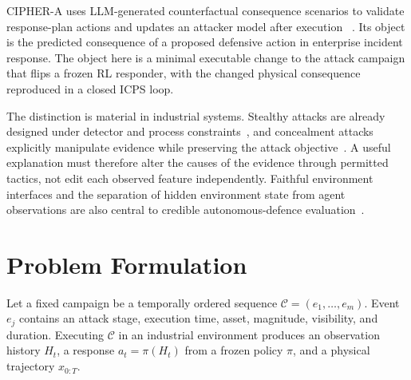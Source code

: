 \documentclass[conference]{IEEEtran}
\begin{document}
CIPHER-A uses LLM-generated counterfactual consequence scenarios to validate
response-plan actions and updates an attacker model after execution
~\cite{kizhakel2026cipher}. Its object is the predicted consequence of a
proposed defensive action in enterprise incident response. The object here is
a minimal executable change to the attack campaign that flips a frozen RL
responder, with the changed physical consequence reproduced in a closed ICPS
loop.

The distinction is material in industrial systems. Stealthy attacks are already
designed under detector and process constraints~\cite{urbina2016stealthy}, and
concealment attacks explicitly manipulate evidence while preserving the attack
objective~\cite{erba2020concealment}. A useful explanation must therefore alter
the causes of the evidence through permitted tactics, not edit each observed
feature independently. Faithful environment interfaces and the separation of
hidden environment state from agent observations are also central to credible
autonomous-defence evaluation~\cite{hicks2026environments}.

\section{Problem Formulation}

Let a fixed campaign be a temporally ordered sequence
$\mathcal{C}=(e_1,\ldots,e_m)$. Event $e_j$ contains an attack stage, execution
time, asset, magnitude, visibility, and duration. Executing $\mathcal{C}$ in an
industrial environment produces an observation history $H_t$, a response
$a_t=\pi(H_t)$ from a frozen policy $\pi$, and a physical trajectory $x_{0:T}$.
\end{document}
